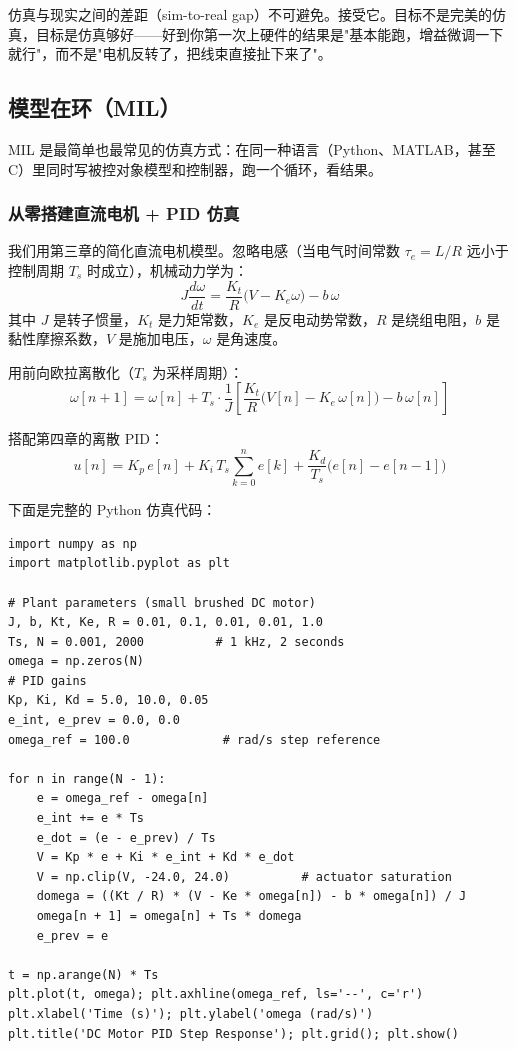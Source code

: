 仿真与现实之间的差距（sim-to-real gap）不可避免。接受它。目标不是完美的仿真，目标是仿真够好——好到你第一次上硬件的结果是"基本能跑，增益微调一下就行"，而不是"电机反转了，把线束直接扯下来了"。

\subsection{模型在环（MIL）}

MIL 是最简单也最常见的仿真方式：在同一种语言（Python、MATLAB，甚至 C）里同时写被控对象模型和控制器，跑一个循环，看结果。

\subsubsection{从零搭建直流电机 + PID 仿真}

我们用第三章的简化直流电机模型。忽略电感（当电气时间常数 $\tau_e = L/R$ 远小于控制周期 $T_s$ 时成立），机械动力学为：
\begin{equation}
J \frac{d\omega}{dt} = \frac{K_t}{R}\bigl(V - K_e \omega\bigr) - b\,\omega
\end{equation}
其中 $J$ 是转子惯量，$K_t$ 是力矩常数，$K_e$ 是反电动势常数，$R$ 是绕组电阻，$b$ 是黏性摩擦系数，$V$ 是施加电压，$\omega$ 是角速度。

用前向欧拉离散化（$T_s$ 为采样周期）：
\begin{equation}
\omega[n+1] = \omega[n] + T_s \cdot
    \frac{1}{J}\left[\frac{K_t}{R}\bigl(V[n] - K_e\,\omega[n]\bigr)
    - b\,\omega[n]\right]
\end{equation}

搭配第四章的离散 PID：
\begin{equation}
u[n] = K_p\,e[n] + K_i\,T_s \sum_{k=0}^{n} e[k]
       + \frac{K_d}{T_s}\bigl(e[n] - e[n-1]\bigr)
\end{equation}

下面是完整的 Python 仿真代码：

\begin{verbatim}
import numpy as np
import matplotlib.pyplot as plt

# Plant parameters (small brushed DC motor)
J, b, Kt, Ke, R = 0.01, 0.1, 0.01, 0.01, 1.0
Ts, N = 0.001, 2000          # 1 kHz, 2 seconds
omega = np.zeros(N)
# PID gains
Kp, Ki, Kd = 5.0, 10.0, 0.05
e_int, e_prev = 0.0, 0.0
omega_ref = 100.0             # rad/s step reference

for n in range(N - 1):
    e = omega_ref - omega[n]
    e_int += e * Ts
    e_dot = (e - e_prev) / Ts
    V = Kp * e + Ki * e_int + Kd * e_dot
    V = np.clip(V, -24.0, 24.0)          # actuator saturation
    domega = ((Kt / R) * (V - Ke * omega[n]) - b * omega[n]) / J
    omega[n + 1] = omega[n] + Ts * domega
    e_prev = e

t = np.arange(N) * Ts
plt.plot(t, omega); plt.axhline(omega_ref, ls='--', c='r')
plt.xlabel('Time (s)'); plt.ylabel('omega (rad/s)')
plt.title('DC Motor PID Step Response'); plt.grid(); plt.show()
\end{verbatim}

